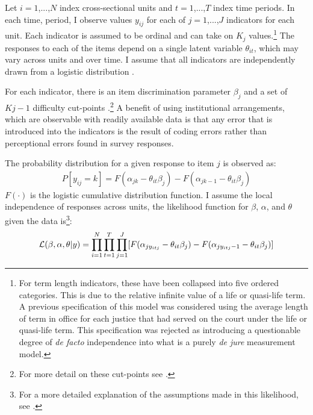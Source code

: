 \documentclass[12pt]{article}
\begin{document}
Let $i=1$,...,$N$ index cross-sectional units and $t=1$,...,$T$ index time periods.  In each time, period, I observe values $y_{ij}$ for each of $j=1$,...,$J$ indicators for each unit.  Each indicator is assumed to be ordinal and can take on $K_j$ values.\footnote{For term length indicators, these have been collapsed into five ordered categories.  This is due to the relative infinite value of a life or quasi-life term.  A previous specification of this model was considered using the average length of term in office for each justice that had served on the court under the life or quasi-life term.  This specification was rejected as introducing a questionable degree of \textit{de facto} independence into what is a purely \textit{de jure} measurement model.}  The responses to each of the items depend on a single latent variable $\theta_{it}$, which may vary across units and over time. I assume that all indicators are independently drawn from a logistic distribution \citep[7]{Schnakenberg2014}. 

For each indicator, there is an item discrimination parameter $\beta_j$ and a set of $Kj-1$ difficulty cut-points \citep[7]{Schnakenberg2014}.\footnote{For more detail on these cut-points see \citep{Treier2008,Schnakenberg2014}.}  A benefit of using institutional arrangements, which are observable with readily available data is that any error that is introduced into the indicators is the result of coding errors rather than perceptional errors found in survey responses.  

The probability distribution for a given response to item $j$ is observed as:
\begin{align}
P[y_{ij}=k]=F(\alpha_{jk}-\theta_{it}\beta_j)-F(\alpha_{jk-1}-\theta_{it}\beta_j)
\end{align} $F(\cdot)$ is the logistic cumulative distribution function.  I assume the local independence of responses across units, the likelihood function for $\beta$, $\alpha$, and $\theta$ given the data is\footnote{For a more detailed explanation of the assumptions made in this likelihood, see \citep[8]{Schnakenberg2014}.}:
\begin{align}\label{like}
{\cal L} (\beta,\alpha,\theta|y)=\prod_{i=1}^{N}\prod_{t=1}^{T}\prod_{j=1}^{J}[F(\alpha_{jy_{itj}}-\theta_{it}\beta_j)-F(\alpha_{jy_{itj}-1}-\theta_{it}\beta_j)]
\end{align} 
\end{document}
